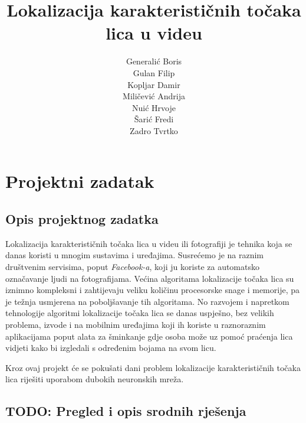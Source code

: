 \documentclass[times, utf8, zavrsni, numeric]{fer}
\begin{document}
\title{ Lokalizacija karakterističnih točaka lica u videu }

\author{ \begin{tabular}{ l }
	Generalić Boris \\
	Gulan Filip \\
	Kopljar Damir \\
	Miličević Andrija \\
	Nuić Hrvoje \\
	Šarić Fredi \\
	Zadro Tvrtko \\
\end{tabular}  }

\maketitle
\tableofcontents

\chapter{Projektni zadatak}

\section{Opis projektnog zadatka}

Lokalizacija karakterističnih točaka lica u videu ili fotografiji je tehnika koja se danas koristi u mnogim sustavima i uređajima. Susrećemo je na raznim društvenim servisima, poput \textit{Facebook-a}, koji ju koriste za automatsko označavanje ljudi na fotografijama. Većina algoritama lokalizacije točaka lica su iznimno kompleksni i zahtijevaju veliku količinu procesorske snage i memorije, pa je težnja usmjerena na poboljšavanje tih algoritama. No razvojem i napretkom tehnologije algoritmi lokalizacije točaka lica se danas uspješno, bez velikih problema, izvode i na mobilnim uređajima koji ih koriste u raznoraznim aplikacijama poput alata za šminkanje gdje osoba može uz pomoć praćenja lica vidjeti kako bi izgledali s određenim bojama na svom licu.

Kroz ovaj projekt će se pokušati dani problem lokalizacije karakterističnih točaka lica riješiti uporabom dubokih neuronskih mreža.

\section{TODO: Pregled i opis srodnih rješenja}

\end{document}
